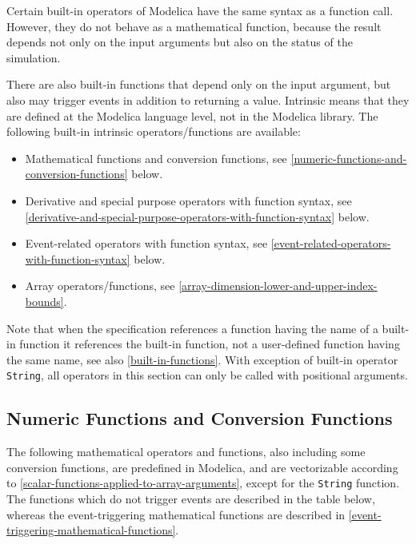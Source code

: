 Certain built-in operators of Modelica have the same syntax as a
function call. However, they do not behave as a mathematical function,
because the result depends not only on the input arguments but also on
the status of the simulation.

There are also built-in functions that depend only on the input
argument, but also may trigger events in addition to returning a value.
Intrinsic means that they are defined at the Modelica language level,
not in the Modelica library. The following built-in intrinsic
operators/functions are available:

\begin{itemize}
\item
  Mathematical functions and conversion functions, see \autoref{numeric-functions-and-conversion-functions}
  below.
\item
  Derivative and special purpose operators with function syntax, see
  \autoref{derivative-and-special-purpose-operators-with-function-syntax} below.
\item
  Event-related operators with function syntax, see \autoref{event-related-operators-with-function-syntax} below.
\item
  Array operators/functions, see \autoref{array-dimension-lower-and-upper-index-bounds}.
\end{itemize}

Note that when the specification references a function having the name
of a built-in function it references the built-in function, not a
user-defined function having the same name, see also \autoref{built-in-functions}. With
exception of built-in operator \lstinline[basicstyle=\ttfamily]!String!, all operators in this section
can only be called with positional arguments.

\subsection{Numeric Functions and Conversion Functions}

The following mathematical operators and functions, also including some
conversion functions, are predefined in Modelica, and are vectorizable
according to \autoref{scalar-functions-applied-to-array-arguments}, except for the \lstinline[basicstyle=\ttfamily]!String! function. The
functions which do not trigger events are described in the table below,
whereas the event-triggering mathematical functions are described in
\autoref{event-triggering-mathematical-functions}.

